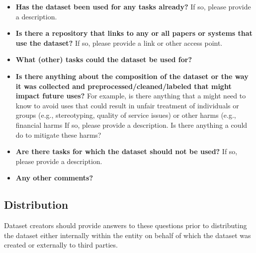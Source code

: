 \begin{itemize}

\item \textbf{Has the dataset been used for any tasks already?} If so, please provide a description.

\item \textbf{Is there a repository that links to any or all papers or systems that use the dataset?} If so, please provide a link or other access point.

\item \textbf{What (other) tasks could the dataset be used for?}

\item \textbf{Is there anything about the composition of the dataset or the way it was collected and preprocessed/cleaned/labeled that might impact future uses?} For example, is there anything that a  might need to know to avoid uses that could result in unfair treatment of individuals or groups (e.g., stereotyping, quality of service issues) or other  harms (e.g.,  financial harms If so, please provide a description. Is there anything a  could do to mitigate these  harms?

\item \textbf{Are there tasks for which the dataset should not be used?} If so, please provide a description.

\item \textbf{Any other comments?}

\end{itemize}

\subsection{Distribution}

Dataset creators should provide answers to these questions prior to
distributing the dataset either internally within the entity on behalf
of which the dataset was created or externally to third parties.\\

